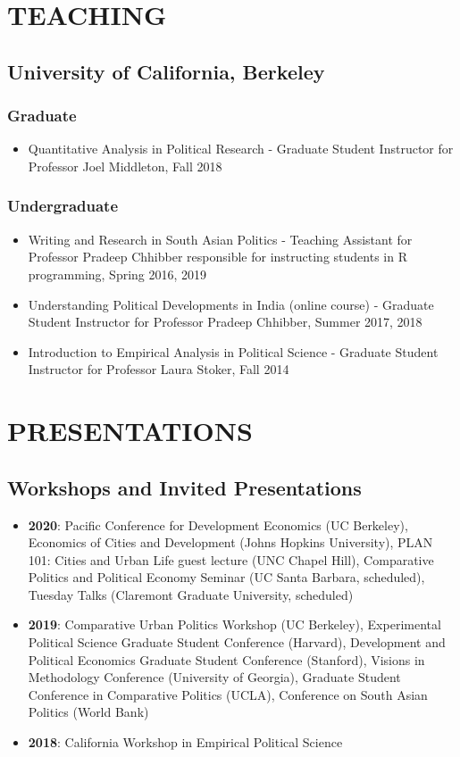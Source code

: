 \documentclass[11pt]{article}
\begin{document}
\vspace{3mm}
\section*{TEACHING}


\subsection*{University of California, Berkeley}
\subsubsection*{Graduate}
\begin{itemize}
	\item[]Quantitative Analysis in Political Research - Graduate Student Instructor for Professor Joel Middleton, Fall 2018 
\end{itemize}
\subsubsection*{Undergraduate}
\begin{itemize}
		\item[]Writing and Research in South Asian Politics - Teaching Assistant for Professor Pradeep Chhibber responsible for instructing students in \textsf{R} programming, Spring 2016, 2019
	\item[]Understanding Political Developments in India (online course) - Graduate Student Instructor for Professor Pradeep Chhibber, Summer 2017, 2018
	\item[]Introduction to Empirical Analysis in Political Science - Graduate Student Instructor for Professor Laura Stoker, Fall 2014	
\end{itemize}

\vspace{3mm}
\section*{PRESENTATIONS}
\subsection*{Workshops and Invited Presentations}
\begin{itemize}[nosep]
\item[] \textbf{2020}: Pacific Conference for Development Economics (UC Berkeley), Economics of Cities and Development (Johns Hopkins University), PLAN 101: Cities and Urban Life guest lecture (UNC Chapel Hill), Comparative Politics and Political Economy Seminar (UC Santa Barbara, scheduled), Tuesday Talks (Claremont Graduate University, scheduled)
\item[] \textbf{2019}: Comparative Urban Politics Workshop (UC Berkeley), Experimental Political Science Graduate Student Conference (Harvard), Development and Political Economics Graduate Student Conference (Stanford), Visions in Methodology Conference (University of Georgia), Graduate Student Conference in Comparative Politics (UCLA), Conference on South Asian Politics (World Bank)
\item[] \textbf{2018}: California Workshop in Empirical Political Science
\end{itemize}
\end{document}
